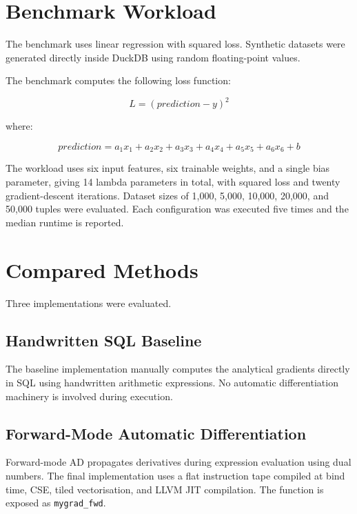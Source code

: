 \documentclass[12pt]{report}
\begin{document}
\section{Benchmark Workload}

The benchmark uses linear regression with squared loss. Synthetic datasets
were generated directly inside DuckDB using random floating-point values.

The benchmark computes the following loss function:

\begin{equation}
L = (\mathit{prediction} - y)^2
\end{equation}

where:

\begin{equation}
\mathit{prediction} = a_1x_1 + a_2x_2 + a_3x_3 + a_4x_4 + a_5x_5 + a_6x_6 + b
\end{equation}

The workload uses six input features, six trainable weights, and a single bias
parameter, giving 14 lambda parameters in total, with squared loss and twenty
gradient-descent iterations. Dataset sizes of 1{,}000, 5{,}000, 10{,}000,
20{,}000, and 50{,}000 tuples were evaluated. Each configuration was executed
five times and the median runtime is reported.

\section{Compared Methods}

Three implementations were evaluated.

\subsection{Handwritten SQL Baseline}

The baseline implementation manually computes the analytical gradients directly
in SQL using handwritten arithmetic expressions. No automatic differentiation
machinery is involved during execution.

\subsection{Forward-Mode Automatic Differentiation}

Forward-mode AD propagates derivatives during expression evaluation using dual
numbers. The final implementation uses a flat instruction tape compiled at bind
time, CSE, tiled vectorisation, and LLVM JIT compilation. The function is
exposed as \texttt{mygrad\_fwd}.
\end{document}
